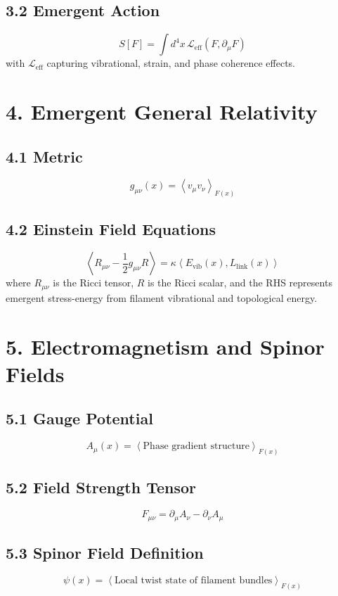 \documentclass[12pt]{article}
\begin{document}
\subsection*{3.2 Emergent Action}
\[
S[F] = \int d^4x \, \mathcal{L}_\text{eff}(F, \partial_\mu F)
\]
with $\mathcal{L}_\text{eff}$ capturing vibrational, strain, and phase coherence effects.

\section*{4. Emergent General Relativity}

\subsection*{4.1 Metric}
\[
g_{\mu\nu}(x) = \left\langle v_\mu v_\nu \right\rangle_{F(x)}
\]

\subsection*{4.2 Einstein Field Equations}
\[
\left\langle R_{\mu\nu} - \frac{1}{2} g_{\mu\nu} R \right\rangle = \kappa \left\langle E_\text{vib}(x), L_\text{link}(x) \right\rangle
\]
where $R_{\mu\nu}$ is the Ricci tensor, $R$ is the Ricci scalar, and the RHS represents emergent stress-energy from filament vibrational and topological energy.

\section*{5. Electromagnetism and Spinor Fields}

\subsection*{5.1 Gauge Potential}
\[
A_\mu(x) = \left\langle \text{Phase gradient structure} \right\rangle_{F(x)}
\]

\subsection*{5.2 Field Strength Tensor}
\[
F_{\mu\nu} = \partial_\mu A_\nu - \partial_\nu A_\mu
\]

\subsection*{5.3 Spinor Field Definition}
\[
\psi(x) = \left\langle \text{Local twist state of filament bundles} \right\rangle_{F(x)}
\]
\end{document}
